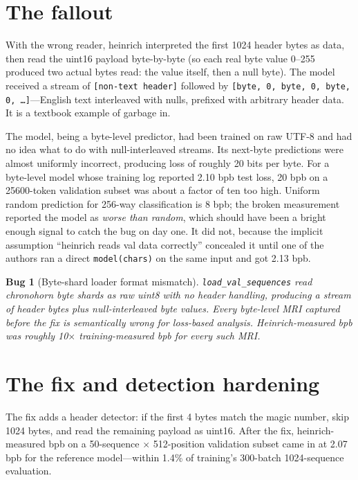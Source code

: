 \documentclass[11pt,openany]{book}
\newtheorem{bug}{Bug}[chapter]
\begin{document}
\section{The fallout}

With the wrong reader, heinrich interpreted the first 1024 header
bytes as data, then read the uint16 payload byte-by-byte (so each
real byte value 0--255 produced two actual bytes read: the value
itself, then a null byte). The model received a stream of
\texttt{[non-text header]} followed by \texttt{[byte, 0, byte, 0,
byte, 0, \ldots]}---English text interleaved with nulls, prefixed
with arbitrary header data. It is a textbook example of garbage in.

The model, being a byte-level predictor, had been trained on raw
UTF-8 and had no idea what to do with null-interleaved streams. Its
next-byte predictions were almost uniformly incorrect, producing loss
of roughly 20 bits per byte. For a byte-level model whose training
log reported 2.10 bpb test loss, 20 bpb on a 25600-token validation
subset was about a factor of ten too high. Uniform random prediction
for 256-way classification is 8 bpb; the broken measurement reported
the model as \emph{worse than random}, which should have been a
bright enough signal to catch the bug on day one. It did not, because
the implicit assumption ``heinrich reads val data correctly''
concealed it until one of the authors ran a direct
\texttt{model(chars)} on the same input and got 2.13 bpb.

\begin{bug}[Byte-shard loader format mismatch]
\texttt{load\_val\_sequences} read chronohorn byte shards as raw
uint8 with no header handling, producing a stream of header bytes
plus null-interleaved byte values. Every byte-level MRI captured
before the fix is semantically wrong for loss-based analysis.
Heinrich-measured bpb was roughly 10$\times$ training-measured bpb for
every such MRI.
\end{bug}

\section{The fix and detection hardening}

The fix adds a header detector: if the first 4 bytes match the magic
number, skip 1024 bytes, and read the remaining payload as uint16.
After the fix, heinrich-measured bpb on a 50-sequence $\times$
512-position validation subset came in at 2.07 bpb for the reference
model---within 1.4\% of training's 300-batch 1024-sequence evaluation.
\end{document}
